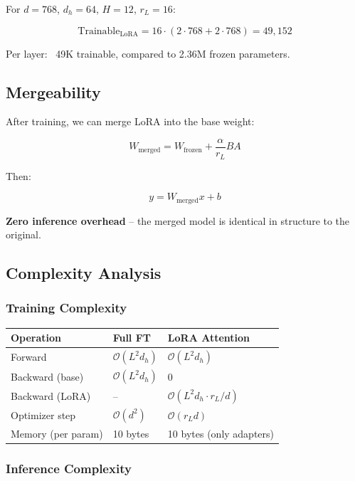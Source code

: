 For $d = 768$, $d_h = 64$, $H = 12$, $r_L = 16$:

\[
\text{Trainable}_\text{LoRA} = 16 \cdot (2 \cdot 768 + 2 \cdot 768) = 49,152
\tag{4.2}
\]

Per layer: ~49K trainable, compared to 2.36M frozen parameters.

\subsection{Mergeability}

After training, we can merge LoRA into the base weight:

\[
W_\text{merged} = W_\text{frozen} + \frac{\alpha}{r_L} B A
\tag{4.3}
\]

Then:

\[
y = W_\text{merged} x + b
\tag{4.4}
\]

\textbf{Zero inference overhead} -- the merged model is identical in structure to 
the original.

\subsection{Complexity Analysis}

\subsubsection{Training Complexity}

\begin{table}[H]
\centering
\small
\begin{tabular}{lll}
\toprule
\textbf{Operation} & \textbf{Full FT} & \textbf{LoRA Attention} \\
\midrule
Forward & $\mathcal{O}(L^2 d_h)$ & $\mathcal{O}(L^2 d_h)$ \\
Backward (base) & $\mathcal{O}(L^2 d_h)$ & 0 \\
Backward (LoRA) & -- & $\mathcal{O}(L^2 d_h \cdot r_L/d)$ \\
Optimizer step & $\mathcal{O}(d^2)$ & $\mathcal{O}(r_L d)$ \\
Memory (per param) & 10 bytes & 10 bytes (only adapters) \\
\bottomrule
\end{tabular}
\end{table}

\subsubsection{Inference Complexity}

